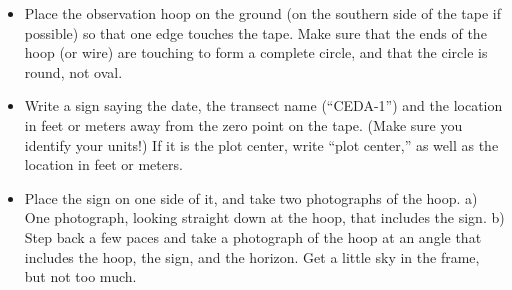 \documentclass[11pt,letterpaper,twoside,onecolumn]{memoir}
\begin{document}
\begin{itemize}
\item Place the observation hoop on the ground (on the southern side of the tape if possible) so that one edge touches the tape. Make sure that the ends of the hoop (or wire) are touching to form a complete circle, and that the circle is round, not oval.
\item Write a sign saying the date, the transect name (``CEDA-1'') and the location in feet or meters away from the zero point on the tape.  (Make sure you identify your units!) If it is the plot center, write ``plot center,'' as well as the location in feet or meters. 
\item  Place the sign on one side of it, and take two photographs of the hoop. a) One photograph, looking straight down at the hoop, that includes the sign. b) Step back a few paces and take a photograph of the hoop at an angle that includes the hoop, the sign, and the horizon. Get a little sky in the frame, but not too much.
\end{itemize}
\end{document}
